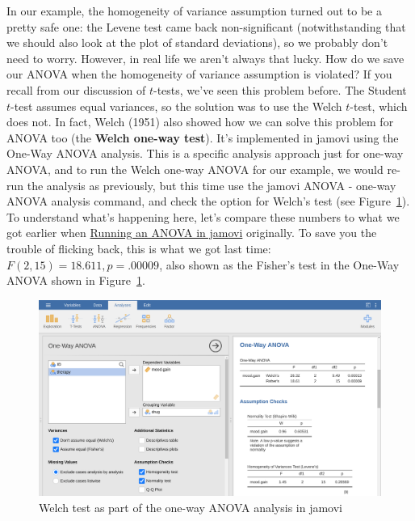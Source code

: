 \documentclass[
  a4paper,
]{book}
\begin{document}
In our example, the homogeneity of variance assumption turned out to be
a pretty safe one: the Levene test came back non-significant
(notwithstanding that we should also look at the plot of standard
deviations), so we probably don't need to worry. However, in real life
we aren't always that lucky. How do we save our ANOVA when the
homogeneity of variance assumption is violated? If you recall from our
discussion of \(t\)-tests, we've seen this problem before. The Student
\(t\)-test assumes equal variances, so the solution was to use the Welch
\(t\)-test, which does not. In fact, Welch (1951) also showed how we can
solve this problem for ANOVA too (the \textbf{Welch one-way test}). It's
implemented in jamovi using the One-Way ANOVA analysis. This is a
specific analysis approach just for one-way ANOVA, and to run the Welch
one-way ANOVA for our example, we would re-run the analysis as
previously, but this time use the jamovi ANOVA - one-way ANOVA analysis
command, and check the option for Welch's test (see
Figure~\ref{fig-fig13-6}). To understand what's happening here, let's
compare these numbers to what we got earlier when
\protect\hyperlink{running-an-anova-in-jamovi}{Running an ANOVA in
jamovi} originally. To save you the trouble of flicking back, this is
what we got last time: \(F(2, 15) = 18.611, p = .00009\), also shown as
the Fisher's test in the One-Way ANOVA shown in
Figure~\ref{fig-fig13-6}.

\begin{figure}

\includegraphics[width=1\textwidth,height=\textheight]{images/fig13-6.png} \hfill{}

\caption{\label{fig-fig13-6}Welch test as part of the one-way ANOVA
analysis in jamovi}

\end{figure}
\end{document}
